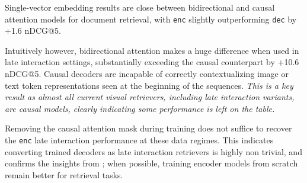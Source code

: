 Single-vector embedding results are close between bidirectional and causal attention models for document retrieval, with \texttt{enc} slightly outperforming \texttt{dec} by +1.6 nDCG@5. 

Intuitively however, bidirectional attention makes a huge difference when used in late interaction settings, substantially exceeding the causal counterpart by +10.6 nDCG@5. 
Causal decoders are incapable of correctly contextualizing image or text token representations seen at the beginning of the sequences. \textit{This is a key result as almost all current visual retrievers, including late interaction variants, are causal models, clearly indicating some performance is left on the table.}

Removing the causal attention mask during training does not suffice to recover the \texttt{enc} late interaction performance at these data regimes. This indicates converting trained decoders as late interaction retrievers is highly non trivial, and confirms the insights from ; when possible, training encoder models from scratch remain better for retrieval tasks.



    
